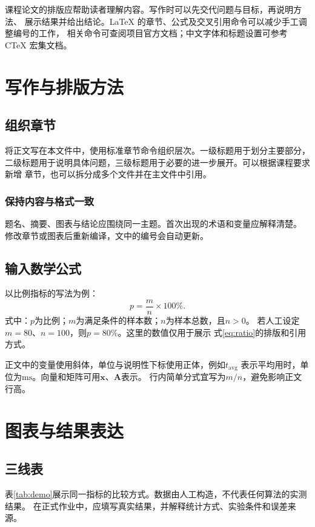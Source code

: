 课程论文的排版应帮助读者理解内容。写作时可以先交代问题与目标，再说明方法、
展示结果并给出结论。LaTeX 的章节、公式及交叉引用命令可以减少手工调整编号的工作，
相关命令可查阅项目官方文档\cite{latex-doc}；中文字体和标题设置可参考
CTeX 宏集文档\cite{ctex-doc}。

\section{写作与排版方法}
\subsection{组织章节}
将正文写在本文件中，使用标准章节命令组织层次。一级标题用于划分主要部分，
二级标题用于说明具体问题，三级标题用于必要的进一步展开。可以根据课程要求新增
章节，也可以拆分成多个文件并在主文件中引用。

\subsubsection{保持内容与格式一致}
题名、摘要、图表与结论应围绕同一主题。首次出现的术语和变量应解释清楚。
修改章节或图表后重新编译，文中的编号会自动更新。

\subsection{输入数学公式}
以比例指标的写法为例：
\begin{equation}
  p = \frac{m}{n}\times 100\% .
  \label{eq:ratio}
\end{equation}
式中：\(p\)为比例；\(m\)为满足条件的样本数；\(n\)为样本总数，且\(n>0\)。
若人工设定\(m=80\)、\(n=100\)，则\(p=80\%\)。这里的数值仅用于展示
式\eqref{eq:ratio}的排版和引用方式。

正文中的变量使用斜体，单位与说明性下标使用正体，例如\(t_{\mathrm{avg}}\)
表示平均用时，单位为\(\mathrm{ms}\)。向量和矩阵可用\(\bm{x}\)、\(\bm{A}\)表示。
行内简单分式宜写为\(m/n\)，避免影响正文行高。

\section{图表与结果表达}
\subsection{三线表}
表\ref{tab:demo}展示同一指标的比较方式。数据由人工构造，不代表任何算法的实测结果。
在正式作业中，应填写真实结果，并解释统计方式、实验条件和误差来源。

